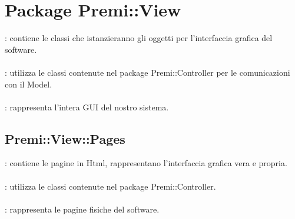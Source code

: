 \section{Package Premi::View}{
		\textbf{\tipo}: contiene le classi che istanzieranno gli oggetti per l'interfaccia grafica del software.\\\\
		\textbf{\relaz}: utilizza le classi contenute nel package Premi::Controller per le comunicazioni con il Model.\\\\
		\textbf{\attivita}: rappresenta l'intera GUI del nostro sistema.
		\subsection{Premi::View::Pages}{
			\textbf{\tipo}: contiene le pagine in Html, rappresentano l'interfaccia grafica vera e propria.\\\\
			\textbf{\relaz}: utilizza le classi contenute nel package Premi::Controller.\\\\
			\textbf{\attivita}: rappresenta le pagine fisiche del software.
			}
}
